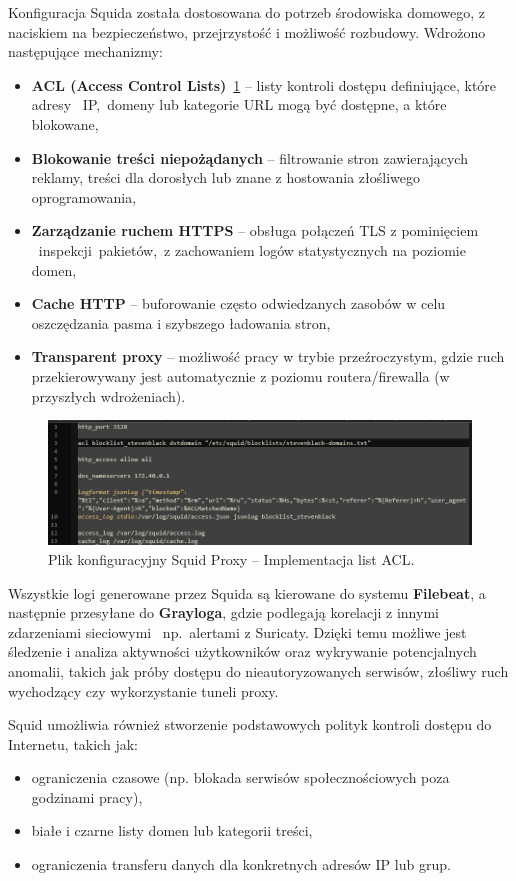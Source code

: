 \documentclass[
    left=2.5cm,         %
    right=2.5cm,        %
    top=2.5cm,          %
    bottom=3cm,         %
    bindingoffset=6mm,  %
    nohyphenation=true %
]{eiti/eiti-thesis} %
\begin{document}
Konfiguracja Squida została dostosowana do potrzeb środowiska domowego, z naciskiem na bezpieczeństwo, przejrzystość i możliwość rozbudowy. Wdrożono następujące mechanizmy:
\begin{itemize}
    \item \textbf{ACL (Access Control Lists)}~\ref{fig:squid-acl} – listy kontroli dostępu definiujące, które adresy ~IP,~domeny lub kategorie URL mogą być dostępne, 
    a które blokowane,
    \item \textbf{Blokowanie treści niepożądanych} – filtrowanie stron zawierających reklamy, treści dla dorosłych lub znane z hostowania złośliwego oprogramowania,
    \item \textbf{Zarządzanie ruchem HTTPS} – obsługa połączeń TLS z pominięciem ~inspekcji~pakietów,~z zachowaniem logów statystycznych na poziomie domen,
    \item \textbf{Cache HTTP} – buforowanie często odwiedzanych zasobów w celu oszczędzania pasma i szybszego ładowania stron,
    \item \textbf{Transparent proxy} – możliwość pracy w trybie przeźroczystym, gdzie ruch przekierowywany jest automatycznie z poziomu routera/firewalla 
    (w przyszłych wdrożeniach).
\end{itemize}

\begin{figure}[H]
    \centering
    \includegraphics[width=\textwidth]{img/squid-acl.png}
    \caption{Plik konfiguracyjny Squid Proxy – Implementacja list ACL.}
    \label{fig:squid-acl}
\end{figure}

Wszystkie logi generowane przez Squida są kierowane do systemu \textbf{Filebeat}, a następnie przesyłane do \textbf{Grayloga}, gdzie podlegają korelacji z innymi zdarzeniami sieciowymi ~np.~alertami z Suricaty. Dzięki temu możliwe jest śledzenie i analiza aktywności użytkowników oraz wykrywanie potencjalnych anomalii, takich jak próby dostępu do nieautoryzowanych serwisów, złośliwy ruch wychodzący czy wykorzystanie tuneli proxy.

Squid umożliwia również stworzenie podstawowych polityk kontroli dostępu do Internetu, takich jak:
\begin{itemize}
    \item ograniczenia czasowe (np. blokada serwisów społecznościowych poza godzinami pracy),
    \item białe i czarne listy domen lub kategorii treści,
    \item ograniczenia transferu danych dla konkretnych adresów IP lub grup.
\end{itemize}
\end{document}

